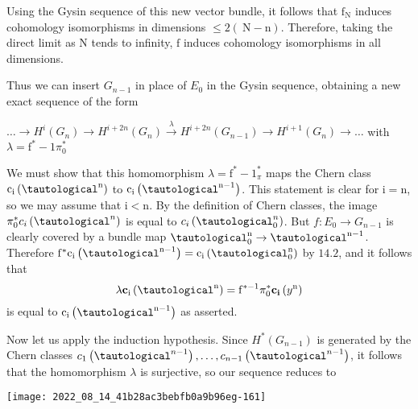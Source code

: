 \documentclass[10pt]{article}
\begin{document}
Using the Gysin sequence of this new vector bundle, it follows that $\mathrm{f}_{\mathrm{N}}$ induces cohomology isomorphisms in dimensions $\leq 2(\mathrm{~N}-\mathrm{n})$. Therefore, taking the direct limit as $\mathrm{N}$ tends to infinity, $\mathrm{f}$ induces cohomology isomorphisms in all dimensions.

Thus we can insert $G_{n-1}$ in place of $E_{0}$ in the Gysin sequence, obtaining a new exact sequence of the form

$\ldots \longrightarrow H^{i}\left(G_{n}\right) \longrightarrow H^{i+2 n}\left(G_{n}\right) \stackrel{\lambda}{\longrightarrow} H^{i+2 n}\left(G_{n-1}\right) \longrightarrow H^{i+1}\left(G_{n}\right) \longrightarrow \ldots$ with $\lambda=\mathrm{f}^{*}-1 \pi_{0}^{*}$

We must show that this homomorphism $\lambda=\mathrm{f}^{*}-1_{\pi}^{*}$ maps the Chern class $\mathrm{c}_{\mathrm{i}}\left(\tautological^{\mathrm{n}}\right)$ to $\mathrm{c}_{\mathrm{i}}\left(\tautological^{\mathrm{n}-1}\right)$. This statement is clear for $\mathrm{i}=\mathrm{n}$, so we may assume that $\mathrm{i}<\mathrm{n}$. By the definition of Chern classes, the image $\pi_{0}^{*} c_{i}\left(\tautological^{n}\right)$ is equal to $c_{i}\left(\tautological_{0}^{n}\right)$. But $f: E_{0} \rightarrow G_{n-1}$ is clearly covered by a bundle map $\tautological_{0}^{\mathrm{n}} \rightarrow \tautological^{\mathrm{n}-1}$. Therefore $\mathrm{f}^{*} \mathrm{c}_{\mathrm{i}}\left(\tautological^{\mathrm{n}-1}\right)=\mathrm{c}_{\mathrm{i}}\left(\tautological_{0}^{\mathrm{n}}\right)$ by $14.2$, and it follows that
$$
\lambda \mathbf{c}_{\mathrm{i}}\left(\tautological^{\mathrm{n}}\right)=\mathrm{f}^{*-1} \pi_{0}^{*} \mathbf{c}_{\mathbf{i}}\left(y^{\mathrm{n}}\right)
$$
is equal to $\mathrm{c}_{\mathrm{i}}\left(\tautological^{\mathrm{n}-1}\right)$ as asserted.

Now let us apply the induction hypothesis. Since $H^{*}\left(G_{n-1}\right)$ is generated by the Chern classes $c_{1}\left(\tautological^{n-1}\right), \ldots, c_{n-1}\left(\tautological^{n-1}\right)$, it follows that the homomorphism $\lambda$ is surjective, so our sequence reduces to

\texttt{[image: 2022\_08\_14\_41b28ac3bebfb0a9b96eg-161]}
\end{document}
